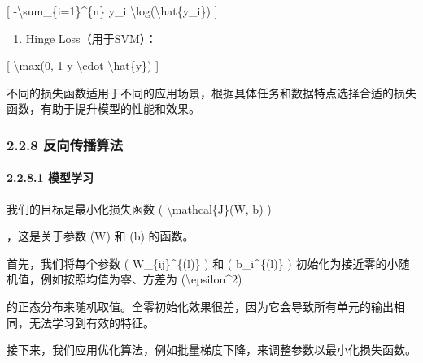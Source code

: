 {[} -\textbackslash sum\_\{i=1\}\^{}\{n\} y\_i
\textbackslash log(\textbackslash hat\{y\_i\}) {]}


\begin{enumerate}
\def\labelenumi{\arabic{enumi}.}
\item
  Hinge Loss（用于SVM）：
\end{enumerate}

{[} \textbackslash max(0, 1 y \textbackslash cdot
\textbackslash hat\{y\}) {]}


不同的损失函数适用于不同的应用场景，根据具体任务和数据特点选择合适的损失函数，有助于提升模型的性能和效果。

\subsubsection{\texorpdfstring{\textbf{2.2.8
反向传播算法}}{2.2.8 反向传播算法}}\label{228-ux53cdux5411ux4f20ux64adux7b97ux6cd5}

\paragraph{\texorpdfstring{\textbf{2.2.8.1
模型学习}}{2.2.8.1 模型学习}}\label{2281-ux6a21ux578bux5b66ux4e60}

我们的目标是最小化损失函数 ( \textbackslash mathcal\{J\}(W, b) )


，这是关于参数 (W) 和 (b) 的函数。

首先，我们将每个参数 ( W\_\{ij\}\^{}\{(l)\} ) 和 ( b\_i\^{}\{(l)\} )
初始化为接近零的小随机值，例如按照均值为零、方差为
(\textbackslash epsilon\^{}2)


的正态分布来随机取值。全零初始化效果很差，因为它会导致所有单元的输出相同，无法学习到有效的特征。

接下来，我们应用优化算法，例如批量梯度下降，来调整参数以最小化损失函数。

